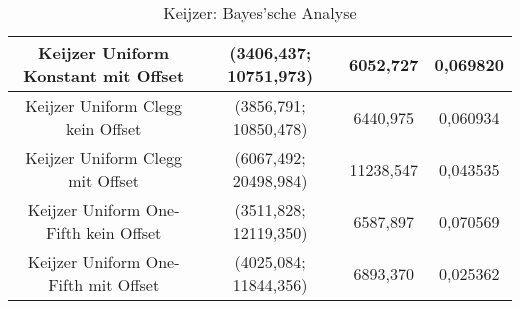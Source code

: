 \begin{table}[H]
\begin{tabular}{c | c | c | c}
		\hline
		Keijzer Uniform Konstant mit Offset & (3406,437; 10751,973) & \color{Green}6052,727\color{black} & \color{Green}0,069820\color{black}\\
		\hline
		Keijzer Uniform Clegg kein Offset & (3856,791; 10850,478) & 6440,975 & 0,060934\\
		\hline
		Keijzer Uniform Clegg mit Offset & \color{red}(6067,492; 20498,984)\color{black} & \color{red}11238,547\color{black} & \color{red}0,043535\color{black}\\
		\hline
		Keijzer Uniform One-Fifth kein Offset & (3511,828; 12119,350) & 6587,897 & \color{Green}0,070569\color{black}\\
		\hline
		Keijzer Uniform One-Fifth mit Offset & (4025,084; 11844,356) & 6893,370 & \color{red}0,025362\color{black}\\
	\end{tabular}
	\caption{Keijzer: Bayes'sche Analyse}
	\label{table:keijzerBayesian}
\end{table}
